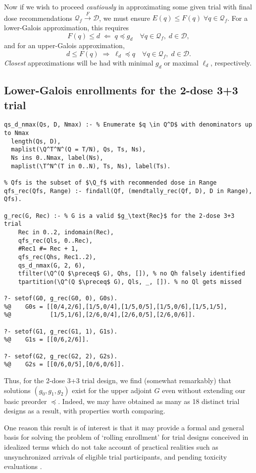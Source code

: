 \documentclass{article}
\newcommand{\D}{\ensuremath{\mathcal{D}}}
\newcommand{\Q}{\ensuremath{\mathcal{Q}}}
\begin{document}
Now if we wish to proceed {\em cautiously} in approximating some given trial with final dose recommendations $\Q_f\!\xrightarrow{F} \D$, we must ensure $E(q) \le F(q) \;\forall q \in \Q_f$.  For a lower-Galois approximation, this requires
\begin{equation}
F(q) \le d \; \Longleftarrow \; q \preceq g_d \quad \forall q \in \Q_f,\; d \in \D, \label{gconstraint}
\end{equation}
and for an upper-Galois approximation,
\begin{equation}
d \le F(q) \; \Longrightarrow \; \ell_d \preceq q \quad \forall q \in \Q_f,\; d \in \D. \label{gconstraint}
\end{equation}
{\em Closest} approximations will be had with minimal $g_d$ or maximal $\ell_d$, respectively.

\subsection{Lower-Galois enrollments for the 2-dose \mbox{3+3} trial}

\begin{lstlisting}
qs_d_nmax(Qs, D, Nmax) :- % Enumerate $q \in Q^D$ with denominators up to Nmax
  length(Qs, D),
  maplist(\Q^T^N^(Q = T/N), Qs, Ts, Ns),
  Ns ins 0..Nmax, label(Ns),
  maplist(\T^N^(T in 0..N), Ts, Ns), label(Ts).

% Qfs is the subset of $\Q_f$ with recommended dose in Range
qfs_rec(Qfs, Range) :- findall(Qf, (mendtally_rec(Qf, D), D in Range), Qfs).

g_rec(G, Rec) :- % G is a valid $g_\text{Rec}$ for the 2-dose 3+3 trial
    Rec in 0..2, indomain(Rec),
    qfs_rec(Qls, 0..Rec),
    #Rec1 #= Rec + 1,
    qfs_rec(Qhs, Rec1..2),
    qs_d_nmax(G, 2, 6),
    tfilter(\Q^(Q $\preceq$ G), Qhs, []), % no Qh falsely identified
    tpartition(\Q^(Q $\preceq$ G), Qls, _, []). % no Ql gets missed

?- setof(G0, g_rec(G0, 0), G0s).
%@    G0s = [[0/4,2/6],[1/5,0/4],[1/5,0/5],[1/5,0/6],[1/5,1/5],
%@           [1/5,1/6],[2/6,0/4],[2/6,0/5],[2/6,0/6]].

?- setof(G1, g_rec(G1, 1), G1s).
%@    G1s = [[0/6,2/6]].

?- setof(G2, g_rec(G2, 2), G2s).
%@    G2s = [[0/6,0/5],[0/6,0/6]].
\end{lstlisting}

Thus, for the 2-dose \mbox{3+3} trial design, we find (somewhat remarkably) that solutions $(g_0, g_1, g_2)$ exist for the upper adjoint $G$ even without extending our basic preorder $\preceq$.  Indeed, we may have obtained as many as 18 distinct trial designs as a result, with properties worth comparing.

One reason this result is of interest is that it may provide a formal and general basis for solving the problem of `rolling enrollment' \cite{skolnik_clinical_2007} for trial designs conceived in idealized terms which do not take account of practical realities such as unsynchronized arrivals of eligible trial participants, and pending toxicity evaluations \cite{frankel_model_2020}.



\end{document}
